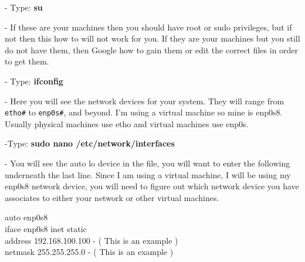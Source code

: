\documentclass[11pt, a4papper]{article}
\begin{document}
\begin{adjustwidth}{3cm}{} 
- Type: \textbf{su} \\
\begin{adjustwidth}{1cm}{} 
\indent - If these are your machines then you should have root or sudo privileges, but if not then this how to will not work for you. If they are your machines but you still do not have them, then Google how to gain them or edit the correct files in order to get them. \\
\end{adjustwidth}
- Type: \textbf{ifconfig} \\
\begin{adjustwidth}{1cm}{} 
\indent - Here you will see the network devices for your system. They will range from \texttt{etho\#} to \texttt{enp0s\#}, and beyond. I'm using a virtual machine so mine is enp0s8. Usually physical machines use etho and virtual machines use enp0s. \\
\end{adjustwidth}
-Type: \textbf{sudo nano /etc/network/interfaces} \\
\begin{adjustwidth}{1cm}{} 
\indent - You will see the auto lo device in the file, you will want to enter the following underneath the last line. Since I am using a virtual machine, I will be using my enp0s8 network device, you will need to figure out which network device you have associates to either your network or other virtual machines.\\
\end{adjustwidth}
\indent \indent auto enp0s8 \\
\indent iface enp0s8 inet static \\
\indent \indent address 192.168.100.100 - ( This is an example ) \\
\indent \indent netmask 255.255.255.0    - ( This is an example ) \\

\pagebreak


\end{adjustwidth}
\end{document}
